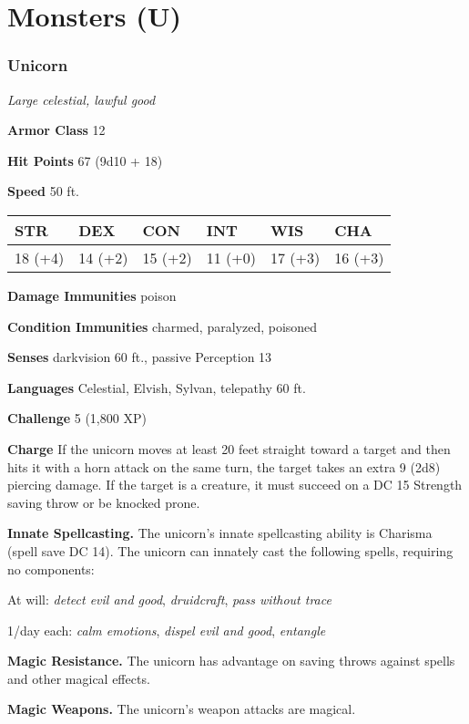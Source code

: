 \documentclass[
]{article}
\date{}
\begin{document}
\hypertarget{monsters-u}{%
\section{Monsters (U)}\label{monsters-u}}

\hypertarget{unicorn}{%
\subsubsection{Unicorn}\label{unicorn}}

\emph{Large celestial, lawful good}

\textbf{Armor Class} 12

\textbf{Hit Points} 67 (9d10 + 18)

\textbf{Speed} 50 ft.

\begin{longtable}[]{@{}llllll@{}}
\toprule
STR & DEX & CON & INT & WIS & CHA\tabularnewline
\midrule
\endhead
18 (+4) & 14 (+2) & 15 (+2) & 11 (+0) & 17 (+3) & 16 (+3)\tabularnewline
\bottomrule
\end{longtable}

\textbf{Damage Immunities} poison

\textbf{Condition Immunities} charmed, paralyzed, poisoned

\textbf{Senses} darkvision 60 ft., passive Perception 13

\textbf{Languages} Celestial, Elvish, Sylvan, telepathy 60 ft.

\textbf{Challenge} 5 (1,800 XP)

\textbf{Charge} If the unicorn moves at least 20 feet straight toward a
target and then hits it with a horn attack on the same turn, the target
takes an extra 9 (2d8) piercing damage. If the target is a creature, it
must succeed on a DC 15 Strength saving throw or be knocked prone.

\textbf{Innate Spellcasting.} The unicorn's innate spellcasting ability
is Charisma (spell save DC 14). The unicorn can innately cast the
following spells, requiring no components:

At will: \emph{detect evil and good}, \emph{druidcraft}, \emph{pass
without trace}

1/day each: \emph{calm emotions}, \emph{dispel evil and good},
\emph{entangle}

\textbf{Magic Resistance.} The unicorn has advantage on saving throws
against spells and other magical effects.

\textbf{Magic Weapons.} The unicorn's weapon attacks are magical.
\end{document}
